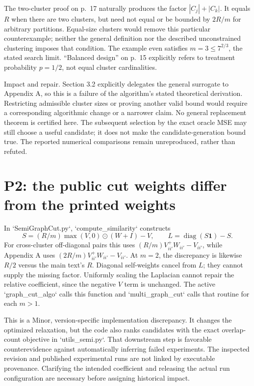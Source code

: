 \documentclass[10pt]{article}
\begin{document}
The two-cluster proof on p. 17 naturally produces the factor \(|C_j|+|C_k|\). It equals \(R\) when there are two clusters, but need not equal or be bounded by \(2R/m\) for arbitrary partitions. Equal-size clusters would remove this particular counterexample; neither the general definition nor the described unconstrained clustering imposes that condition. The example even satisfies \(m=3\le 7^{2/3}\), the stated search limit. “Balanced design” on p. 15 explicitly refers to treatment probability \(p=1/2\), not equal cluster cardinalities.\par
Impact and repair. Section 3.2 explicitly delegates the general surrogate to Appendix A, so this is a failure of the algorithm’s stated theoretical derivation. Restricting admissible cluster sizes or proving another valid bound would require a corresponding algorithmic change or a narrower claim. No general replacement theorem is certified here. The subsequent selection by the exact oracle MSE may still choose a useful candidate; it does not make the candidate-generation bound true. The reported numerical comparisons remain unreproduced, rather than refuted.\par
\section*{P2: the public cut weights differ from the printed weights}
In `SemiGraphCut.py`, `compute\_similarity` constructs \[S=(R/m)\max(V,0)\odot(W+I)-V,\qquad L=\operatorname{diag}(S\mathbf1)-S.\] For cross-cluster off-diagonal pairs this uses \((R/m)V^+_{ii'}W_{ii'}-V_{ii'}\), while Appendix A uses \((2R/m)V^+_{ii'}W_{ii'}-V_{ii'}\). At \(m=2\), the discrepancy is likewise \(R/2\) versus the main text’s \(R\). Diagonal self-weights cancel from \(L\); they cannot supply the missing factor. Uniformly scaling the Laplacian cannot repair the relative coefficient, since the negative \(V\) term is unchanged. The active `graph\_cut\_algo` calls this function and `multi\_graph\_cut` calls that routine for each \(m>1\).\par
This is a Minor, version-specific implementation discrepancy. It changes the optimized relaxation, but the code also ranks candidates with the exact overlap-count objective in `utils\_semi.py`. That downstream step is favorable counterevidence against automatically inferring failed experiments. The inspected revision and published experimental runs are not linked by executable provenance. Clarifying the intended coefficient and releasing the actual run configuration are necessary before assigning historical impact.\par
\end{document}
